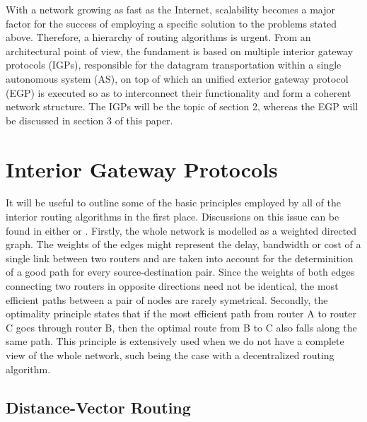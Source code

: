 \documentclass{acm_proc_article-sp}
\begin{document}
With a network growing as fast as the Internet, scalability becomes a major factor for the success of employing a specific solution to the problems stated above. Therefore, a hierarchy of routing algorithms is urgent. From an architectural point of view, the fundament is based on multiple interior gateway protocols (IGPs), responsible for the datagram transportation within a single autonomous system (AS), on top of which an unified exterior gateway protocol (EGP) is executed so as to interconnect their functionality and form a coherent network structure. The IGPs will be the topic of section 2, whereas the EGP will be discussed in section 3 of this paper.

\section{Interior Gateway Protocols}

It will be useful to outline some of the basic principles employed by all of the interior routing algorithms in the first place. Discussions on this issue can be found in either \cite{kurose} or \cite{tanenbaum}. Firstly, the whole network is modelled as a weighted directed graph. The weights of the edges might represent the delay, bandwidth or cost of a single link between two routers and are taken into account for the determinition of a good path for every source-destination pair. Since the weights of both edges connecting two routers in opposite directions need not be identical, the most efficient paths between a pair of nodes are rarely symetrical. Secondly, the optimality principle states that if the most efficient path from router A to router C goes through router B, then the optimal route from B to C also falls along the same path. This principle is extensively used when we do not have a complete view of the whole network, such being the case with a decentralized routing algorithm.

\subsection{Distance-Vector Routing}
\end{document}
